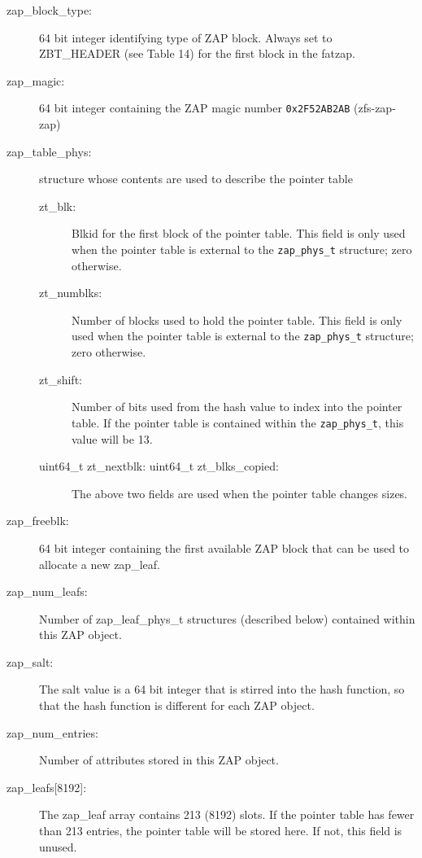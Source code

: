 \begin{description}

\item[zap\_block\_type:]
64 bit integer identifying type of ZAP block. Always set to ZBT\_HEADER (see Table 14) for the first block in the fatzap.

\item[zap\_magic:]
  64 bit integer containing the ZAP magic number \lstinline{0x2F52AB2AB} (zfs-zap-zap)

\item[zap\_table\_phys:]
  structure whose contents are used to describe the pointer table

  \begin{description}
  \item[zt\_blk:]
    Blkid for the first block of the pointer table.
    This field is only used when the pointer table is external to the \lstinline{zap_phys_t} structure;
    zero otherwise.

  \item[zt\_numblks:]
    Number of blocks used to hold the pointer table.
    This field is only used when the pointer table is external to
    the \lstinline{zap_phys_t} structure; zero otherwise.

  \item[zt\_shift:]
    Number of bits used from the hash value to index into the pointer table.
    If the pointer table is contained within the \lstinline{zap_phys_t},
    this value will be 13.

  \item[uint64\_t zt\_nextblk: uint64\_t zt\_blks\_copied:]
    The above two fields are used when the pointer table changes sizes.
  \end{description}

\item[zap\_freeblk:]
  64 bit integer containing the first available ZAP block that can be used to allocate a new zap\_leaf.

\item[zap\_num\_leafs:]
  Number of zap\_leaf\_phys\_t structures (described below) contained within this ZAP object.

\item[zap\_salt:]
  The salt value is a 64 bit integer that is stirred into the hash function,
  so that the hash function is different for each ZAP object.

\item[zap\_num\_entries:]
  Number of attributes stored in this ZAP object.

\item[zap\_leafs{[8192]}:]
  The zap\_leaf array contains 213 (8192) slots.
  If the pointer table has fewer than 213 entries,
  the pointer table will be stored here.
  If not, this field is unused.
\end{description}

